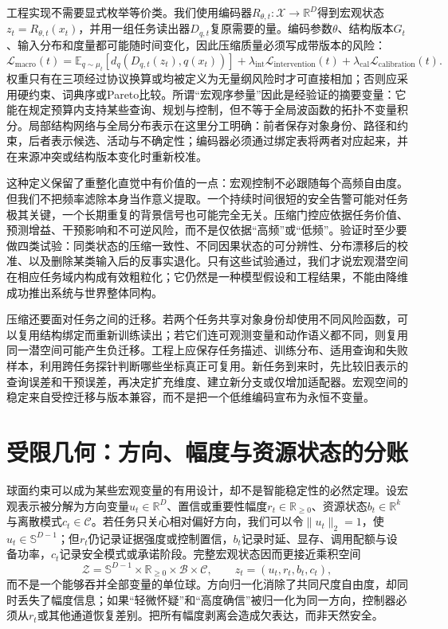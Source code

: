 工程实现不需要显式枚举等价类。我们使用编码器$R_{\theta,t}:\mathcal X\rightarrow\mathbb R^D$得到宏观状态$z_t=R_{\theta,t}(x_t)$，并用一组任务读出器$D_{q,t}$复原需要的量。编码参数$\theta$、结构版本$G_t$、输入分布和度量都可能随时间变化，因此压缩质量必须写成带版本的风险：
\begin{equation}
 \mathcal L_{\mathrm{macro}}(t)=
 \mathbb E_{q\sim\mu_t}\!\left[d_q\!\left(D_{q,t}(z_t),q(x_t)\right)\right]
 +\lambda_{\mathrm{int}}\mathcal L_{\mathrm{intervention}}(t)
 +\lambda_{\mathrm{cal}}\mathcal L_{\mathrm{calibration}}(t).
\end{equation}
权重只有在三项经过协议换算或均被定义为无量纲风险时才可直接相加；否则应采用硬约束、词典序或Pareto比较。所谓“宏观序参量”因此是经验证的摘要变量：它能在规定预算内支持某些查询、规划与控制，但不等于全局波函数的拓扑不变量积分。局部结构网络与全局分布表示在这里分工明确：前者保存对象身份、路径和约束，后者表示候选、活动与不确定性；编码器必须通过绑定表将两者对应起来，并在来源冲突或结构版本变化时重新校准。

这种定义保留了重整化直觉中有价值的一点：宏观控制不必跟随每个高频自由度。但我们不把频率滤除本身当作意义提取。一个持续时间很短的安全告警可能对任务极其关键，一个长期重复的背景信号也可能完全无关。压缩门控应依据任务价值、预测增益、干预影响和不可逆风险，而不是仅依据“高频”或“低频”。验证时至少要做四类试验：同类状态的压缩一致性、不同因果状态的可分辨性、分布漂移后的校准、以及删除某类输入后的反事实退化。只有这些试验通过，我们才说宏观潜空间在相应任务域内构成有效粗粒化；它仍然是一种模型假设和工程结果，不能由降维成功推出系统与世界整体同构。

压缩还要面对任务之间的迁移。若两个任务共享对象身份却使用不同风险函数，可以复用结构绑定而重新训练读出；若它们连可观测变量和动作语义都不同，则复用同一潜空间可能产生负迁移。工程上应保存任务描述、训练分布、适用查询和失败样本，利用跨任务探针判断哪些坐标真正可复用。新任务到来时，先比较旧表示的查询误差和干预误差，再决定扩充维度、建立新分支或仅增加适配器。宏观空间的稳定来自受控迁移与版本兼容，而不是把一个低维编码宣布为永恒不变量。

\section{受限几何：方向、幅度与资源状态的分账}
\label{sec:hypersphere_geometry_constraint}

球面约束可以成为某些宏观变量的有用设计，却不是智能稳定性的必然定理。设宏观表示被分解为方向变量$u_t\in\mathbb R^D$、置信或重要性幅度$r_t\in\mathbb R_{\geq0}$、资源状态$b_t\in\mathbb R^k$与离散模式$c_t\in\mathcal C$。若任务只关心相对偏好方向，我们可以令$\|u_t\|_2=1$，使$u_t\in\mathbb S^{D-1}$；但$r_t$仍记录证据强度或控制置信，$b_t$记录时延、显存、调用配额与设备功率，$c_t$记录安全模式或承诺阶段。完整宏观状态因而更接近乘积空间
\begin{equation}
 \mathcal Z=\mathbb S^{D-1}\times\mathbb R_{\geq0}\times\mathcal B\times\mathcal C,
 \qquad z_t=(u_t,r_t,b_t,c_t),
\end{equation}
而不是一个能够吞并全部变量的单位球。方向归一化消除了共同尺度自由度，却同时丢失了幅度信息；如果“轻微怀疑”和“高度确信”被归一化为同一方向，控制器必须从$r_t$或其他通道恢复差别。把所有幅度剥离会造成欠表达，而非天然安全。

